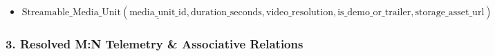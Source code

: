 \begin{itemize}
  \begin{itemize}
  \item
    \(\text{Foreign Key: } \text{season\_id} \to \text{Season}(\text{season\_id}) \text{ ON DELETE CASCADE}\)
  \item
    \(\text{Foreign Key (Unique): } \text{media\_unit\_id} \to \text{Streamable\_Media\_Unit}(\text{media\_unit\_id})\)
  \item
    \(\text{Candidate Key (Unique): } \{\text{season\_id},\allowbreak   \text{episode\_number}\}\)
  \end{itemize}
\item
  \(\text{Streamable\_Media\_Unit}(\underline{\text{media\_unit\_id}},\allowbreak   \text{duration\_seconds},\allowbreak   \text{video\_resolution},\allowbreak   \text{is\_demo\_or\_trailer},\allowbreak   \text{storage\_asset\_url})\)
\end{itemize}

\subsubsection*{3. Resolved M:N Telemetry \& Associative Relations}



